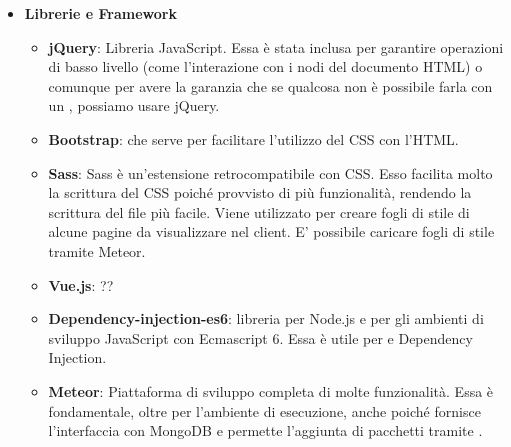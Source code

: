 \begin{itemize}
\begin{itemize}
	\end{itemize}
	\item \textbf{Librerie e Framework}
	\begin{itemize}
	\item \textbf{jQuery}: Libreria JavaScript. Essa è stata inclusa per garantire operazioni di basso livello (come l'interazione con i nodi del documento HTML) o comunque per avere la garanzia che se qualcosa non è possibile farla con un , possiamo usare jQuery.
	\item \textbf{Bootstrap}:  che serve per facilitare l'utilizzo del CSS con l'HTML.
	\item \textbf{Sass}: Sass è un'estensione retrocompatibile con CSS. Esso facilita molto la scrittura del CSS poiché provvisto di più funzionalità, rendendo la scrittura del file più facile. Viene utilizzato per creare fogli di stile di alcune pagine da visualizzare nel client. E' possibile caricare fogli di stile tramite Meteor.
	\item \textbf{Vue.js}: ??
	\item \textbf{Dependency-injection-es6}: libreria per Node.js e per gli ambienti di sviluppo JavaScript con Ecmascript 6. Essa è utile per  e {Dependency Injection}.
	\item \textbf{Meteor}: Piattaforma di sviluppo completa di molte funzionalità. Essa è fondamentale, oltre per l'ambiente di esecuzione, anche poiché fornisce l'interfaccia con MongoDB e permette l'aggiunta di pacchetti tramite .
	\end{itemize}
\end{itemize}

